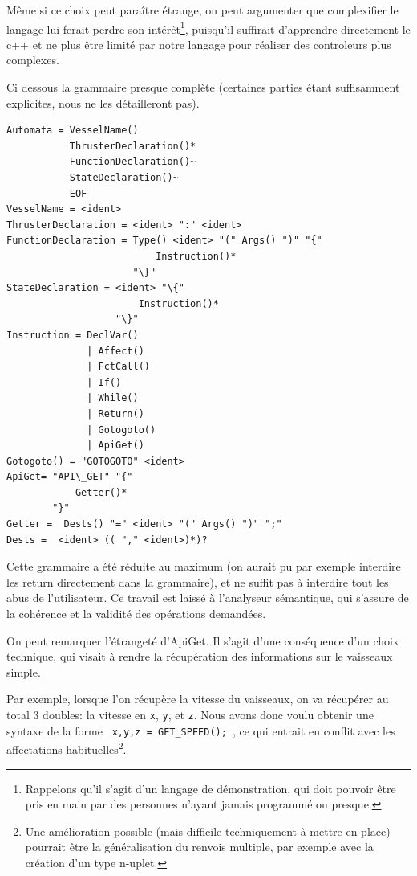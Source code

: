 \documentclass[a4paper,11pt]{article}
\begin{document}
        Même si ce choix peut paraître étrange, on peut argumenter que complexifier le langage lui ferait perdre son intérêt\footnote{Rappelons qu'il s'agit d'un langage de démonstration, qui doit pouvoir être pris en main par des personnes n'ayant jamais programmé ou presque.}, puisqu'il suffirait d'apprendre directement le c++ et ne plus être limité par notre langage pour réaliser des controleurs plus complexes.
        
        Ci dessous la grammaire presque complète (certaines parties étant suffisamment explicites, nous ne les détailleront pas).

        \begin{Verbatim}[frame=single]
Automata = VesselName()
           ThrusterDeclaration()*
           FunctionDeclaration()~
           StateDeclaration()~
           EOF
VesselName = <ident>
ThrusterDeclaration = <ident> ":" <ident>
FunctionDeclaration = Type() <ident> "(" Args() ")" "{"
                          Instruction()*  
                      "\}"  
StateDeclaration = <ident> "\{"
                       Instruction()* 
                   "\}" 
Instruction = DeclVar()
              | Affect()
              | FctCall()
              | If() 
              | While() 
              | Return()
              | Gotogoto() 
              | ApiGet() 
Gotogoto() = "GOTOGOTO" <ident>
ApiGet= "API\_GET" "{" 
            Getter()*
        "}"
Getter =  Dests() "=" <ident> "(" Args() ")" ";"
Dests =  <ident> (( "," <ident>)*)?
        \end{Verbatim}

        Cette grammaire a été réduite au maximum (on aurait pu par exemple interdire les return directement dans la grammaire), et ne suffit pas à interdire tout les abus de l'utilisateur. Ce travail est laissé à l'analyseur sémantique, qui s'assure de la cohérence et la validité des opérations demandées.
        
        On peut remarquer l'étrangeté d'ApiGet. Il s'agit d'une conséquence d'un choix technique, qui visait à rendre la récupération des informations sur le vaisseaux simple. 
        
        Par exemple, lorsque l'on récupère la vitesse du vaisseaux, on va récupérer au total 3 doubles: la vitesse en \verb|x|, \verb|y|, et \verb|z|. Nous avons donc voulu obtenir une syntaxe de la forme \verb| x,y,z = GET_SPEED(); |, ce qui entrait en conflit avec les affectations habituelles\footnote{Une amélioration possible (mais difficile techniquement à mettre en place) pourrait être la généralisation du renvois multiple, par exemple avec la création d'un type n-uplet.}.
        
\end{document}
